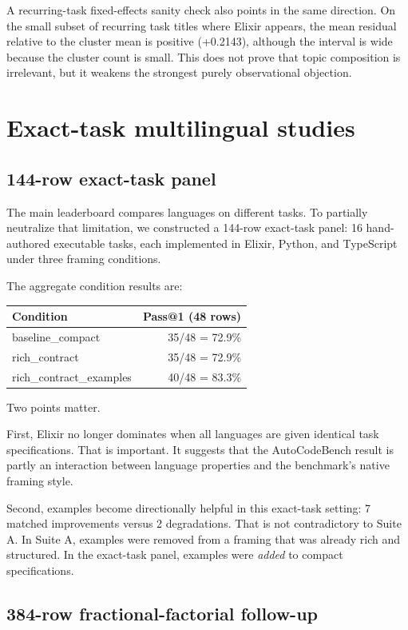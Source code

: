 \documentclass[11pt]{article}
\makeatletter
\newcommand{\acb}{AutoCodeBench}
\newcommand{\passatone}{Pass@1}
\newcommand{\elixir}{Elixir}
\newcommand{\pythonlang}{Python}
\newcommand{\tslang}{TypeScript}
\makeatother
\begin{document}
A recurring-task fixed-effects sanity check also points in the same direction. On the small subset of recurring task titles where \elixir{} appears, the mean residual relative to the cluster mean is positive (+0.2143), although the interval is wide because the cluster count is small. This does not prove that topic composition is irrelevant, but it weakens the strongest purely observational objection.

\section{Exact-task multilingual studies}

\subsection{144-row exact-task panel}

The main leaderboard compares languages on different tasks. To partially neutralize that limitation, we constructed a 144-row exact-task panel: 16 hand-authored executable tasks, each implemented in \elixir{}, \pythonlang{}, and \tslang{} under three framing conditions.

The aggregate condition results are:
\begin{center}
\begin{tabular}{lr}
\toprule
Condition & \passatone{} (48 rows) \\
\midrule
baseline\_compact & 35/48 = 72.9\% \\
rich\_contract & 35/48 = 72.9\% \\
rich\_contract\_examples & 40/48 = 83.3\% \\
\bottomrule
\end{tabular}
\end{center}

Two points matter.

First, \elixir{} no longer dominates when all languages are given identical task specifications. That is important. It suggests that the \acb{} result is partly an interaction between language properties and the benchmark's native framing style.

Second, examples become directionally helpful in this exact-task setting: 7 matched improvements versus 2 degradations. That is not contradictory to Suite A. In Suite A, examples were removed from a framing that was already rich and structured. In the exact-task panel, examples were \emph{added} to compact specifications.

\subsection{384-row fractional-factorial follow-up}
\end{document}
